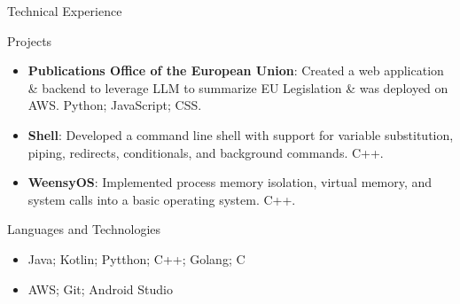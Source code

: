 \documentclass[]{mcdowellcv}
\begin{document}
	\begin{cvsection}{Technical Experience}
		\begin{cvsubsection}{Projects}{}{}
			\begin{itemize}
                \item \textbf{Publications Office of the European Union}: Created a web application \& backend to leverage LLM to summarize EU Legislation \& was deployed on AWS. Python; JavaScript; CSS.
				\item \textbf{Shell}: Developed a command line shell with support for variable substitution, piping, redirects, conditionals, and background commands. C++.
				\item \textbf{WeensyOS}: Implemented process memory isolation, virtual memory, and system calls into a basic operating system. C++.
			\end{itemize}
		\end{cvsubsection}
	\end{cvsection}
	
	\begin{cvsection}{Languages and Technologies}
		\begin{cvsubsection}{}{}{}	
			\begin{itemize}
				\item Java; Kotlin; Pytthon; C++; Golang; C
				\item AWS; Git; Android Studio
			\end{itemize}
		\end{cvsubsection}
	\end{cvsection}

		
\end{document}
